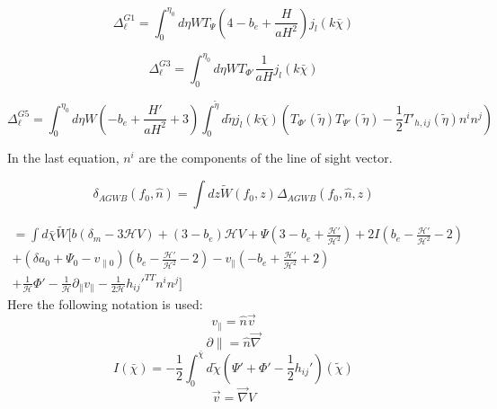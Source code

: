 \begin{equation}
    \Delta_\ell^{G1}=\int_0^{\eta_0} d\eta W T_\Psi \left(4-b_e+\frac{H}{aH^2}\right) j_l(k \bar{\chi})
\end{equation}

\begin{equation}
    \Delta_\ell^{G3}=\int_0^{\eta_0} d\eta W T_{\Phi'} \frac{1}{aH} j_l(k \bar{\chi})
\end{equation}

\begin{equation}
    \Delta_\ell^{G5}=\int_0^{\eta_0} d\eta W \left(-b_e + \frac{H'}{aH^2} +3\right) \int_0^{\tilde{\eta}} d\tilde{\eta} j_l(k \bar{\chi}) \left( T_{\Phi'}(\tilde{\eta})T_{\Psi'}(\tilde{\eta})-\frac{1}{2}T'_{h, ij}(\tilde{\eta})n^i n^j \right)
\end{equation}

In the last equation, $n^i$ are the components of the line of sight vector.

\begin{equation}
    \label{window_fct_def}
        \delta_{AGWB}(f_0, \hat{n})=\int dz \tilde{W}(f_0, z)\Delta_{AGWB}(f_0, \hat{n}, z)
    \end{equation}

\begin{equation}
    \begin{split}
        = \int d\bar{\chi} \tilde{W} [b(\delta_m - 3\mathcal{H}V)+(3-b_e)\mathcal{H}V+
        \Psi(3-b_e+\frac{\mathcal{H'}}{\mathcal{H}^2})+2I(b_e
        -\frac{\mathcal{H'}}{\mathcal{H}^2}-2) \\
        +(\delta a_0+\Psi_0 - v_{\parallel 0})(b_e
        -\frac{\mathcal{H'}}{\mathcal{H}^2}-2)-v_\parallel (-b_e
        +\frac{\mathcal{H'}}{\mathcal{H}^2}+2) \\
        +\frac{1}{\mathcal{H}}\Phi' 
        -\frac{1}{\mathcal{H}}\partial_\parallel v_\parallel 
        - \frac{1}{2\mathcal{H}}h_{ij}'^{TT} n^i n^j]
    \end{split}
    \end{equation}
    Here the following notation is used:
    \begin{equation}
            v_\parallel = \hat{n} \vec{v} 
    \end{equation}
    \begin{equation}
            \partial{\parallel} = \hat{n} \vec{\nabla} 
    \end{equation}
    \begin{equation}
            I(\bar{\chi}) = -\frac{1}{2} \int_0^{\bar{\chi}} d\tilde{\chi} 
            (\Psi' + \Phi ' -\frac{1}{2}h_{ij}')(\tilde{\chi} )
    \end{equation}
    \begin{equation}
            \vec{v} = \vec{\nabla} V 
    \end{equation}


